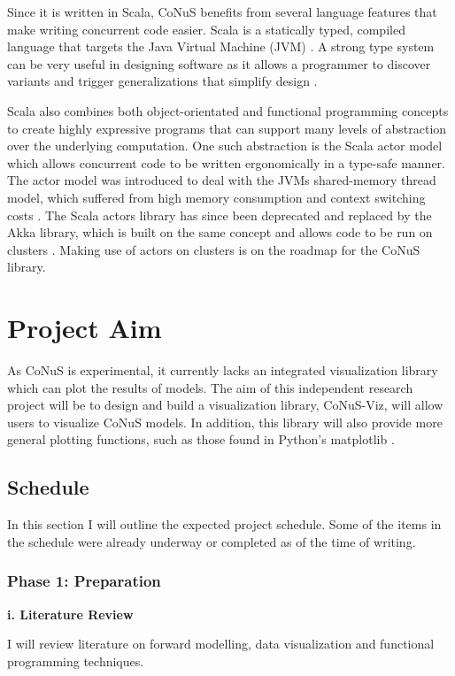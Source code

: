 \documentclass[12pt]{article}
\begin{document}
Since it is written in Scala, CoNuS benefits from several language features that make writing concurrent code easier. Scala is a statically typed, compiled language that targets the Java Virtual Machine (JVM) \cite{scala}. A strong type system can be very useful in designing software as it allows a programmer to discover variants and trigger generalizations that simplify design \cite{LAMMEL20081}. 

Scala also combines both object-orientated and functional programming concepts to create highly expressive programs that can support many levels of abstraction over the underlying computation. One such abstraction is the Scala actor model which allows concurrent code to be written ergonomically in a type-safe manner. The actor model was introduced to deal with the JVMs shared-memory thread model, which suffered from high memory consumption and context switching costs \cite{haller_odersky_2009}. The Scala actors library has since been deprecated and replaced by the Akka library, which is built on the same concept and allows code to be run on clusters \cite{akka}. Making use of actors on clusters is on the roadmap for the CoNuS library.

\section{Project Aim}
As CoNuS is experimental, it currently lacks an integrated visualization library which can plot the results of models. The aim of this independent research project will be to design and build a visualization library, CoNuS-Viz, will allow users to visualize CoNuS models. In addition, this library will also provide more general plotting functions, such as those found in Python's matplotlib \cite{matplotlib}.

\subsection{Schedule}
In this section I will outline the expected project schedule. Some of the items in the schedule were already underway or completed as of the time of writing.

\subsubsection{Phase 1: Preparation}

\textbf{i. Literature Review}

I will review literature on forward modelling, data visualization and functional programming techniques. 
\end{document}
